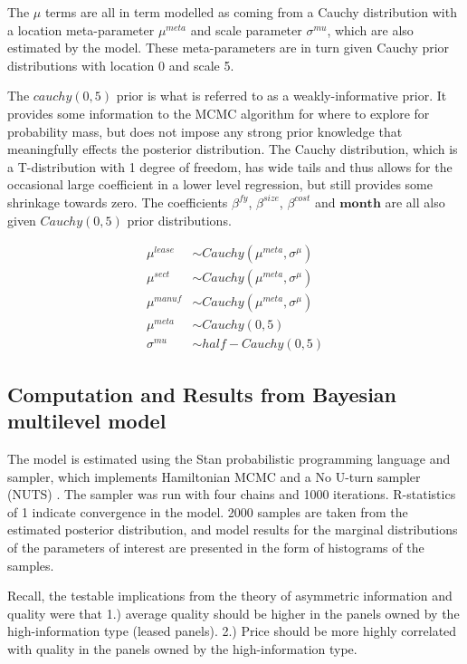 \documentclass[12pt]{article}
\begin{document}
The $\mu$ terms are all in term modelled as coming from a Cauchy distribution with a location meta-parameter $\mu^{meta}$ and scale parameter $\sigma^{mu}$, which are also estimated by the model. These meta-parameters are in turn given Cauchy prior distributions with location 0 and scale 5.

The $cauchy(0,5)$ prior is what is referred to as a weakly-informative prior. It provides some information to the MCMC algorithm for where to explore for probability mass, but does not impose any strong prior knowledge that meaningfully effects the posterior distribution. The Cauchy distribution, which is a T-distribution with 1 degree of freedom, has wide tails and thus allows for the occasional large coefficient in a lower level regression, but still provides some shrinkage towards zero. \citep{gelman_weakly_2008} The coefficients $\beta^{fy}$, $\beta^{size}$, $\beta^{cost}$ and $\mathbf{month}$ are all also given $Cauchy(0,5)$ prior distributions.

\begin{align}
\mu^{lease} &\sim Cauchy(\mu^{meta}, \sigma^{\mu}) \\ %
\mu^{sect} &\sim Cauchy(\mu^{meta}, \sigma^{\mu}) \\ %
\mu^{manuf} &\sim Cauchy(\mu^{meta}, \sigma^{\mu}) \\ %
\mu^{meta} &\sim Cauchy(0, 5) \\ %
\sigma^{mu} &\sim half-Cauchy(0,5) %
\end{align}


\subsection{Computation and Results from Bayesian multilevel model}

The model is estimated using the Stan probabilistic programming language and sampler, which implements Hamiltonian MCMC and a No U-turn sampler (NUTS) \citep{stan_development_team_stan_2014}. The sampler was run with four chains and 1000 iterations. R-statistics of 1 indicate convergence in the model. 2000 samples are taken from the estimated posterior distribution, and model results for the marginal distributions of the parameters of interest are presented in the form of histograms of the samples.

Recall, the testable implications from the theory of asymmetric information and quality were that 1.) average quality should be higher in the panels owned by the high-information type (leased panels). 2.) Price should be more highly correlated with quality in the panels owned by the high-information type.
\end{document}
